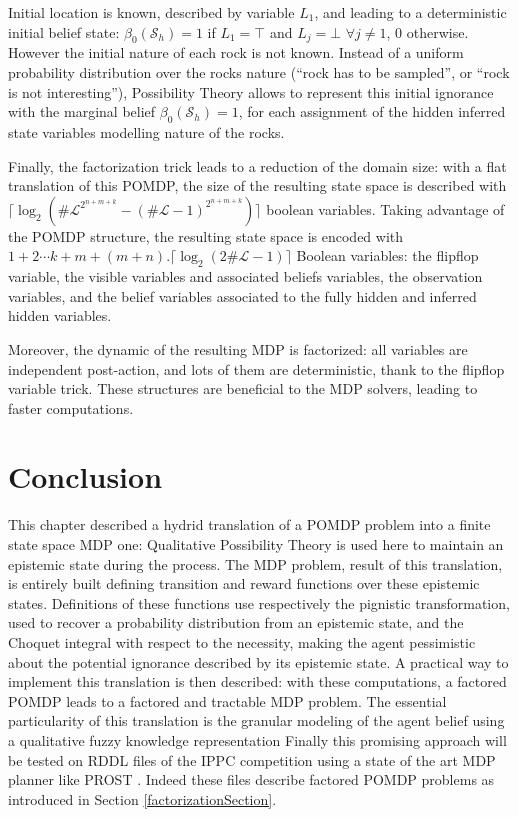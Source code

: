 Initial location is known, described by variable $L_1$, and leading to a deterministic initial belief state: 
$\beta_0(\mathcal{S}_h) = 1$ if $L_1=\top$ and $L_j = \bot$ $\forall j \neq 1$, $0$ otherwise. However
the initial nature of each rock is not known. Instead of a uniform probability distribution over the
rocks nature (``rock has to be sampled'', or ``rock is not interesting''), Possibility Theory allows to represent this initial ignorance with the
marginal belief $\beta_0(\mathcal{S}_h) = 1$, for each assignment of the hidden inferred state variables
modelling nature of the rocks. 

Finally, the factorization trick leads to a reduction of the domain size: 
with a flat translation of this POMDP, the size of the resulting state space is described with
$\lceil \log_2( \# \mathcal{L}^{2^{n+m+k}} - (\# \mathcal{L}-1)^{2^{n+m+k}}) \rceil$ boolean variables.
Taking advantage of the POMDP structure, the resulting state space is encoded with 
$1+2 \cdots k+m+(m+n).\lceil \log_2(2 \# \mathcal{L} -1 )  \rceil$ Boolean variables:
the flipflop variable, the visible variables and associated beliefs variables, 
the observation variables, and the belief variables 
associated to the fully hidden and inferred hidden variables.

Moreover, the dynamic of the resulting MDP is factorized: all variables are independent post-action,
and lots of them are deterministic, thank to the flipflop variable trick.
These structures are beneficial to the MDP solvers,
leading to faster computations.

\section{Conclusion}
This chapter described a hydrid translation 
of a POMDP problem into a finite state space MDP one:  
Qualitative Possibility Theory
is used here to maintain an epistemic state during the process. 
The MDP problem, result of this translation, 
is entirely built defining transition and reward functions
over these epistemic states. 
Definitions of these functions use respectively the pignistic transformation,
used to recover a probability distribution 
from an epistemic state, 
and the Choquet integral with respect to the necessity, 
making the agent pessimistic about the potential ignorance 
described by its epistemic state.
A practical way to implement this translation 
is then described: 
with these computations, 
a factored POMDP leads to a factored and tractable MDP problem. 
The essential particularity of this translation 
is the granular modeling of the agent belief 
using a qualitative fuzzy knowledge representation 
Finally this promising approach will be tested on RDDL files 
of the IPPC competition \cite{SannerIPPC1111}
using a state of the art MDP planner like PROST 
\cite{DBLP:conf/aips/KellerE12}. Indeed these files describe
factored POMDP problems as introduced in Section \ref{factorizationSection}.

